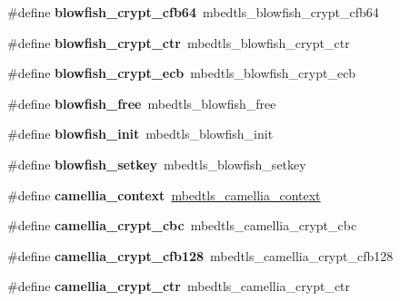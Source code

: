 \begin{DoxyCompactItemize}
\#define {\bfseries blowfish\+\_\+crypt\+\_\+cfb64}~mbedtls\+\_\+blowfish\+\_\+crypt\+\_\+cfb64
\item 
\mbox{\label{compat-1_83_8h_aa1bab5e4d7e9af085f0c24f4986246b1}} 
\#define {\bfseries blowfish\+\_\+crypt\+\_\+ctr}~mbedtls\+\_\+blowfish\+\_\+crypt\+\_\+ctr
\item 
\mbox{\label{compat-1_83_8h_a3aed8a20e4f762f24a1319de775fe934}} 
\#define {\bfseries blowfish\+\_\+crypt\+\_\+ecb}~mbedtls\+\_\+blowfish\+\_\+crypt\+\_\+ecb
\item 
\mbox{\label{compat-1_83_8h_a95cd8a27267071b271db4101687b5ceb}} 
\#define {\bfseries blowfish\+\_\+free}~mbedtls\+\_\+blowfish\+\_\+free
\item 
\mbox{\label{compat-1_83_8h_a1a0efd8113c646c339a0721c6f16d029}} 
\#define {\bfseries blowfish\+\_\+init}~mbedtls\+\_\+blowfish\+\_\+init
\item 
\mbox{\label{compat-1_83_8h_acc0d47cd16208bcc569a6b409fc53686}} 
\#define {\bfseries blowfish\+\_\+setkey}~mbedtls\+\_\+blowfish\+\_\+setkey
\item 
\mbox{\label{compat-1_83_8h_a1f9bdd9db4bda932cba612c6e9b357bd}} 
\#define {\bfseries camellia\+\_\+context}~\mbox{\hyperlink{structmbedtls__camellia__context}{mbedtls\+\_\+camellia\+\_\+context}}
\item 
\mbox{\label{compat-1_83_8h_a9b439cd7dd824b4a6d89ba9e6f1fd15c}} 
\#define {\bfseries camellia\+\_\+crypt\+\_\+cbc}~mbedtls\+\_\+camellia\+\_\+crypt\+\_\+cbc
\item 
\mbox{\label{compat-1_83_8h_a69b290f0ef2d1102155dd0d8af8e599f}} 
\#define {\bfseries camellia\+\_\+crypt\+\_\+cfb128}~mbedtls\+\_\+camellia\+\_\+crypt\+\_\+cfb128
\item 
\mbox{\label{compat-1_83_8h_acfd5d988e7758c76d9d2276e6c8844dc}} 
\#define {\bfseries camellia\+\_\+crypt\+\_\+ctr}~mbedtls\+\_\+camellia\+\_\+crypt\+\_\+ctr
\item 
\mbox{\label{compat-1_83_8h_a20764e83972b8d7079d170f05548d61f}} 

\end{DoxyCompactItemize}
